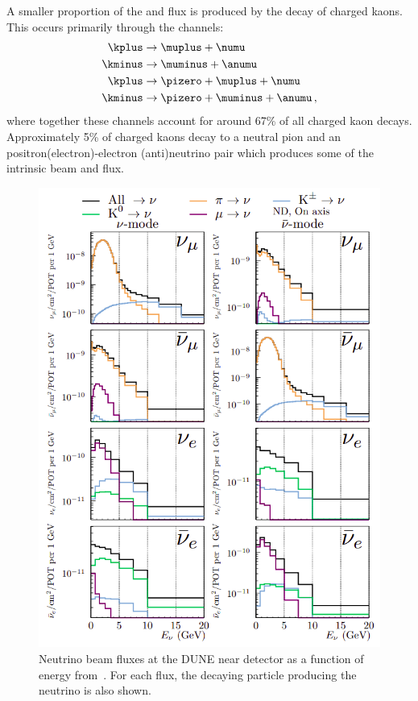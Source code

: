 A smaller proportion of the \numu and \anumu flux is produced by the decay of charged kaons.
This occurs primarily through the channels:
\begin{align}
  \kplus &\rightarrow \muplus + \numu \\
  \kminus &\rightarrow \muminus + \anumu \\
  \kplus &\rightarrow \pizero + \muplus + \numu \\
  \kminus &\rightarrow \pizero + \muminus + \anumu \, ,
\end{align}
where together these channels account for around 67\% of all charged kaon decays.
Approximately 5\% of charged kaons decay to a neutral pion and an positron(electron)-electron (anti)neutrino pair which produces some of the intrinsic beam \nue and \anue flux.

\begin{figure}[h]
  \centering
  \includegraphics[width=.9\linewidth]{files/figures/dune_detector/duneNDFlux}
  \caption[Neutrino beam fluxes at the DUNE near detector as a function of neutrino energy.]{Neutrino beam fluxes at the DUNE near detector as a function of energy from~\cite{tdrVol2}. For each flux, the decaying particle producing the neutrino is also shown.}
  \label{fig:ndFluxes}
\end{figure}

